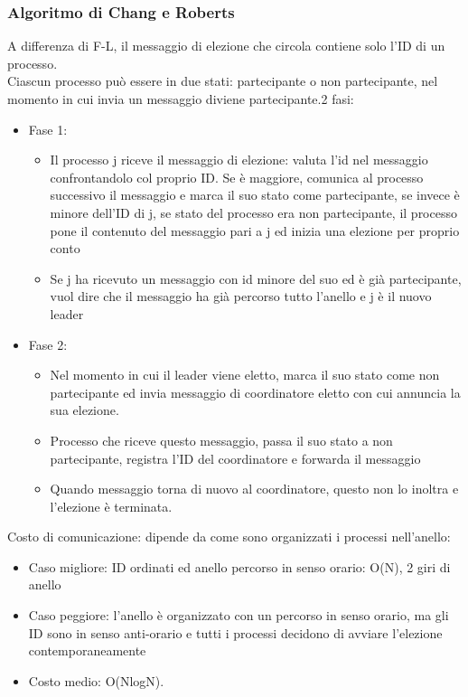 \documentclass[16px]{article}
\begin{document}
\subsubsection{Algoritmo di Chang e Roberts}
A differenza di F-L, il messaggio di elezione che circola contiene solo l'ID di un processo.\\ Ciascun processo può essere in due stati: partecipante o non partecipante, nel momento in cui invia un messaggio diviene partecipante.2 fasi:
\begin{itemize}
\item Fase 1:
\begin{itemize}
\item Il processo j riceve il messaggio di elezione: valuta l'id nel messaggio confrontandolo col proprio ID. Se è maggiore, comunica al processo successivo il messaggio e marca il suo stato come partecipante, se invece è minore dell'ID di j, se stato del processo era non partecipante, il processo pone il contenuto del messaggio pari a j ed inizia una elezione per proprio conto
\item Se j ha ricevuto un messaggio con id minore del suo ed è già partecipante, vuol dire che il messaggio ha già percorso tutto l'anello e j è il nuovo leader
\end{itemize}
\item Fase 2:
\begin{itemize}
\item Nel momento in cui il leader viene eletto, marca il suo stato come non partecipante ed invia messaggio di coordinatore eletto con cui annuncia la sua elezione.
\item Processo che riceve questo messaggio, passa il suo stato a non partecipante, registra l'ID del coordinatore e forwarda il messaggio
\item Quando messaggio torna di nuovo al coordinatore, questo non lo inoltra e l'elezione è terminata.
\end{itemize}
\end{itemize}
Costo di comunicazione: dipende da come sono organizzati i processi nell'anello:
\begin{itemize}
\item Caso migliore: ID ordinati ed anello percorso in senso orario: O(N), 2 giri di anello
\item Caso peggiore: l'anello è organizzato con un percorso in senso orario, ma gli ID sono in senso anti-orario e tutti i processi decidono di avviare l'elezione contemporaneamente
\item Costo medio: O(NlogN).
\end{itemize}
\end{document}
